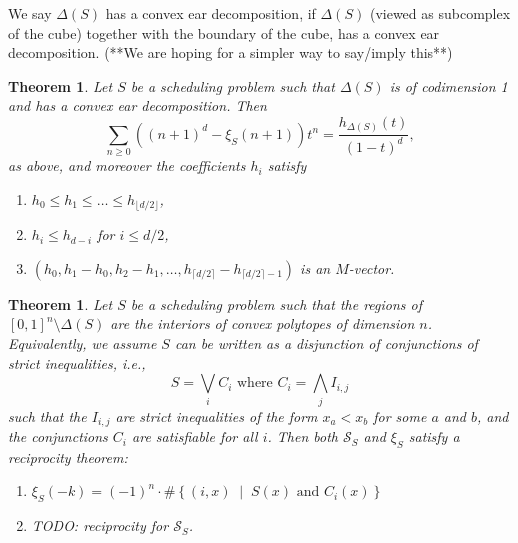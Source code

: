 \documentclass[12pt,reqno]{amsart}
\numberwithin{definition}{section}
\newtheorem{theorem}[definition]{Theorem}
\newcommand{\SSS}{\mathcal{S}}
\newcommand{\floor}[1]{\lfloor {#1} \rfloor}
\newcommand{\ceil}[1]{\lceil {#1} \rceil}
\newcommand{\mset}[2]{ \left\{ #1 \; \middle| \; #2 \right\}}
\begin{document}
We say $\Delta(S)$ has a convex ear
decomposition, if $\Delta(S)$ (viewed as subcomplex of the cube)
together with the boundary of the cube, has a convex ear
decomposition. (**We are hoping for a simpler way to say/imply this**)


\begin{theorem}
Let $S$ be a scheduling problem such that $\Delta(S)$ is of codimension 1 and has a convex ear decomposition. Then 
\[
  \sum_{n \geq 0} ((n+1)^d - \xi_S(n+1)) t^n = \frac{h_{\Delta(S)}(t)}{(1-t)^d},
\]
as above, and moreover the coefficients $h_i$ satisfy
\begin{enumerate}
\item $h_0 \leq h_1 \leq \ldots \leq h_{\floor{d/2}}$,
\item $h_i\leq h_{d-i}$ for $i\leq d/2$,
\item $(h_0,h_1-h_0,h_2-h_1,\ldots,h_{\ceil{d/2}}-h_{\ceil{d/2}-1})$ is an $M$-vector.
\end{enumerate}
\end{theorem}





\begin{theorem}
Let $S$ be a scheduling problem such that the regions of $[0,1]^n\setminus\Delta(S)$ are the interiors of convex polytopes of dimension $n$. Equivalently, we assume $S$ can be written as a disjunction of conjunctions of strict inequalities, i.e.,
\[
  S = \bigvee_i C_i \text{ where } C_i = \bigwedge_j I_{i,j}
\] 
such that the $I_{i,j}$ are strict inequalities of the form $x_a < x_b$ for some $a$ and $b$, and the conjunctions $C_i$ are satisfiable for all $i$. Then both $\SSS_S$ and $\xi_S$ satisfy a reciprocity theorem:
\begin{enumerate}
\item $\xi_S(-k) = (-1)^n\cdot \#\mset{(i,x)}{S(x) \text{ and } C_i(x)}$
\item TODO: reciprocity for $\SSS_S$.
\end{enumerate}
\end{theorem}
\end{document}
